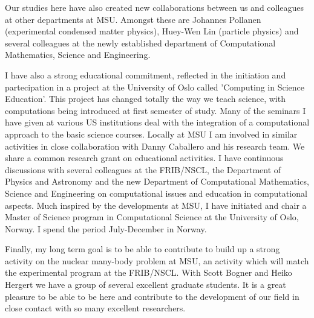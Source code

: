 \documentclass[prc,amsart,english,superscriptaddress,showpacs,floatfix]{revtex4}
\begin{document}
Our studies here have also created new collaborations between us and
colleagues at other departments at MSU.  Amongst these are Johannes
Pollanen (experimental condensed matter physics), Huey-Wen Lin
(particle physics) and several colleagues at the newly established
department of Computational Mathematics, Science and Engineering.


I have also a strong educational commitment, reflected in the
initiation and partecipation in a project at the University of Oslo
called 'Computing in Science Education'. This project has changed
totally the way we teach science, with computations being introduced
at first semester of study. Many of the seminars I have given at
various US institutions deal with the integration of a computational
approach to the basic science courses. Locally at MSU I am involved in
similar activities in close collaboration with Danny Caballero and his research team.
We share a common research grant on educational activities.
I have continuous discussions with
several colleagues at the FRIB/NSCL, the Department of Physics and
Astronomy and the new Department of Computational Mathematics, Science
and Engineering on computational issues and education in computational
aspects. Much inspired by the developments at MSU, I have initiated
and chair a Master of Science program in Computational Science at the
University of Oslo, Norway. I spend the period July-December in
Norway.


Finally, my long term goal is to be able to contribute to build up a
strong activity on the nuclear many-body problem at MSU, an activity
which will match the experimental program at the FRIB/NSCL. With
Scott Bogner and Heiko Hergert we have a group of several excellent graduate students. It is a great pleasure to be able to be here and contribute to the development of our field in close contact with so many excellent researchers.


 
\end{document}
